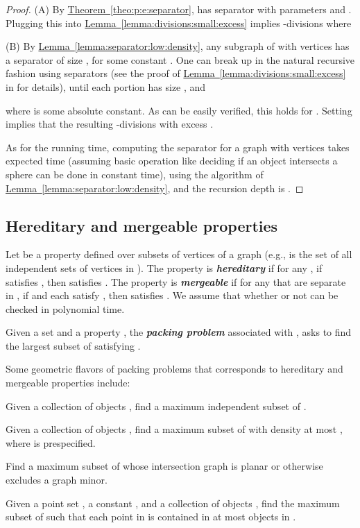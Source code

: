 \documentclass[12pt]{article}
\newcommand{\emphic}[2]{\textcolor{blue25}{\textbf{\emph{#1}}}\index{#2}}
\renewcommand{\emphic}[2]{\textbf{\emph{#1}}}
\newcommand{\emphi}[1]{\emphic{#1}{#1}}
\theoremstyle{remark}\theoremheaderfont{\sf}\theorembodyfont{\upshape}
\numberwithin{figure}{section}\numberwithin{table}{section}\numberwithin{equation}{section}
\newcommand{\HLink}[2]{\hyperref[#2]{#1~\ref*{#2}}}
\newcommand{\HLinkPage}[2]{\hyperref[#2]{#1~\ref*{#2}}}
\newcommand{\seclab}[1]{\label{sec:#1}} \newcommand{\secref}[1]{\HLink{Section}{sec:#1}} \newcommand{\secrefpage}[1]{\HLinkPage{Section}{sec:#1}}
\newcommand{\exmlab}[1]{\label{example:#1}}
\newcommand{\lemref}[1]{\HLink{Lemma}{lemma:#1}}
\newcommand{\thmref}[1]{\HLink{Theorem}{theo:#1}}
\begin{document}
\begin{proof}
  (A) By \thmref{p:e:separator},  has separator with
  parameters  and .  Plugging
  this into \lemref{divisions:small:excess} implies
  -divisions where
  

  (B) By \lemref{separator:low:density}, any subgraph of  with
   vertices has a separator of size
  , for some
  constant . One can break up  in the natural recursive
  fashion using separators (see the proof of
  \lemref{divisions:small:excess} in \cite{hq-naape-16-arxiv} for
  details), until each portion has size , and
  
  where  is some absolute constant.  As can be easily verified,
  this holds for . Setting
   implies that the resulting -divisions with
  excess .

  As for the running time, computing the separator for a graph with
   vertices takes expected  time (assuming basic operation
  like deciding if an object intersects a sphere can be done in
  constant time), using the algorithm of
  \lemref{separator:low:density}, and the recursion depth is
  .
\end{proof}


\subsection{Hereditary and mergeable properties}
\seclab{h:m:prop}

Let  be a property defined over subsets
of vertices of a graph  (e.g.,  is
the set of all independent sets of vertices in ). The property
 is \emphi{hereditary} if for any
, if  satisfies
, then  satisfies .  The property  is
\emphi{mergeable} if for any  that
are separate in , if  and  each satisfy ,
then  satisfies . We assume that whether or
not  can be checked in polynomial time.

Given a set  and a property ,
the \emphi{packing problem} associated with , asks to find the
largest subset of  satisfying .

\begin{example}
  \exmlab{geometric:packing}Some geometric flavors of packing problems that corresponds to
  hereditary and mergeable properties include:
  \begin{compactenum}[\quad(A)]
  \item Given a collection of objects , find a maximum
    independent subset of .

  \item Given a collection of objects , find a maximum subset
    of  with density at most , where 
    is prespecified.

  \item Find a maximum subset of  whose intersection graph is
    planar or otherwise excludes a graph minor.

  \item Given a point set , a constant , and a collection
    of objects , find the maximum subset of  such
    that each point in  is contained in at most  objects
    in .
  \end{compactenum}
\end{example}
\end{document}

